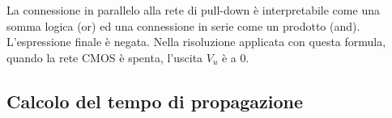 \documentclass{article}
\begin{document}
La connessione in parallelo alla rete di pull-down è interpretabile come una somma logica (or) ed una connessione in serie come un prodotto (and).
L'espressione finale è negata.
Nella risoluzione applicata con questa formula, quando la rete CMOS è spenta, l'uscita $V_u$ è a 0.

\subsection*{Calcolo del tempo di propagazione}
\end{document}
